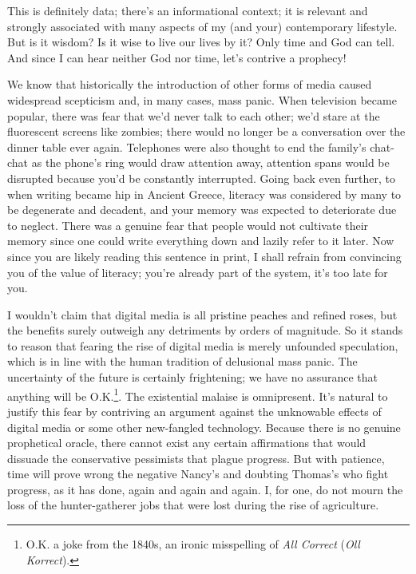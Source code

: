 This is definitely data; there's an informational context; it is relevant and strongly associated with many aspects of my (and your) contemporary lifestyle. But is it wisdom? Is it wise to live our lives by it? Only time and God can tell. And since I can hear neither God nor time, let's contrive a prophecy!

We know that historically the introduction of other forms of media caused widespread scepticism and, in many cases, mass panic. When television became popular, there was fear that we'd never talk to each other; we'd stare at the fluorescent screens like zombies; there would no longer be a conversation over the dinner table ever again. Telephones were also thought to end the family's chat-chat as the phone's ring would draw attention away, attention spans would be disrupted because you'd be constantly interrupted. Going back even further, to when writing became hip in Ancient Greece, literacy was considered by many to be degenerate and decadent, and your memory was expected to deteriorate due to neglect. There was a genuine fear that people would not cultivate their memory since one could write everything down and lazily refer to it later. Now since you are likely reading this sentence in print, I shall refrain from convincing you of the value of literacy; you're already part of the system, it's too late for you.

I wouldn't claim that digital media is all pristine peaches and refined roses, but the benefits surely outweigh any detriments by orders of magnitude. So it stands to reason that fearing the rise of digital media is merely unfounded speculation, which is in line with the human tradition of delusional mass panic. The uncertainty of the future is certainly frightening; we have no assurance that anything will be O.K.\footnote{O.K. a joke from the 1840s, an ironic misspelling of \textit{All Correct} (\textit{Oll Korrect}).}. The existential malaise is omnipresent. It's natural to justify this fear by contriving an argument against the unknowable effects of digital media or some other new-fangled technology. Because there is no genuine prophetical oracle, there cannot exist any certain affirmations that would dissuade the conservative pessimists that plague progress. But with patience, time will prove wrong the negative Nancy's and doubting Thomas's who fight progress, as it has done, again and again and again. I, for one, do not mourn the loss of the hunter-gatherer jobs that were lost during the rise of agriculture.


